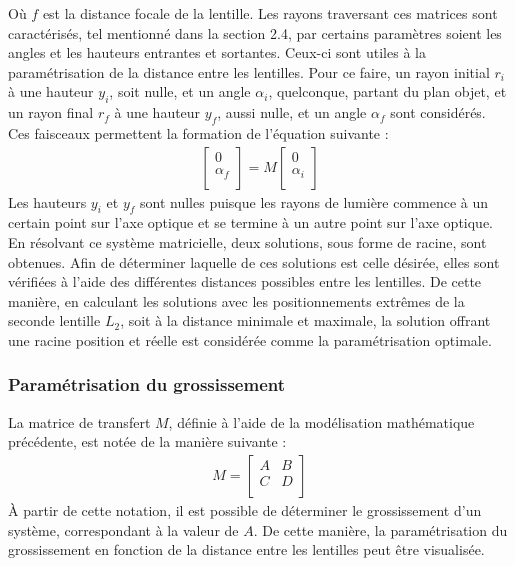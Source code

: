 \documentclass[11pt,letterpaper]{article}
\begin{document}
Où $f$ est la distance focale de la lentille. Les rayons traversant ces matrices sont caractérisés, tel mentionné dans la section 2.4, par certains paramètres soient les angles et les hauteurs entrantes et sortantes. Ceux-ci sont utiles à la paramétrisation de la distance entre les lentilles. Pour ce faire, un rayon initial $r_i$ à une hauteur $y_i$, soit nulle, et un angle $\alpha_i$, quelconque, partant du plan objet, et un rayon final $r_f$ à une hauteur $y_f$, aussi nulle, et un angle $\alpha_f$ sont considérés. Ces faisceaux permettent la formation de l'équation suivante :
\begin{gather}
  \begin{bmatrix}
    0 \\
    \alpha_f \\
  \end{bmatrix}=M
  \begin{bmatrix}
    0 \\
    \alpha_i \\
  \end{bmatrix}
\end{gather}
Les hauteurs $y_i$ et $y_f$ sont nulles puisque les rayons de lumière commence à un certain point sur l'axe optique et se termine à un autre point sur l'axe optique. En résolvant ce système matricielle, deux solutions, sous forme de racine, sont obtenues. Afin de déterminer laquelle de ces solutions est celle désirée, elles sont vérifiées à l'aide des différentes distances possibles entre les lentilles. De cette manière, en calculant les solutions avec les positionnements extrêmes de la seconde lentille $L_2$, soit à la distance minimale et maximale, la solution offrant une racine position et réelle est considérée comme la paramétrisation optimale.

\subsubsection{Paramétrisation du grossissement}
La matrice de transfert $M$, définie à l'aide de la modélisation mathématique précédente, est notée de la manière suivante :
\begin{gather}
  M=
  \begin{bmatrix}
    A & B \\
    C & D \\
  \end{bmatrix}
\end{gather}
À partir de cette notation, il est possible de déterminer le grossissement d'un système, correspondant à la valeur de $A$. De cette manière, la paramétrisation du grossissement en fonction de la distance entre les lentilles peut être visualisée.
\end{document}
